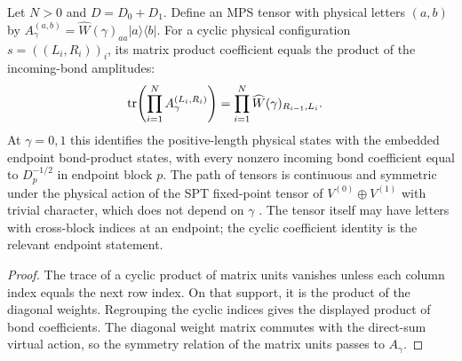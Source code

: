 \begin{lemma}
    \label{thm:spt_weighted_matrix_unit_bond_product}
    \leanok
    Let $N>0$ and $D=D_0+D_1$. Define an MPS tensor with physical
    letters $(a,b)$ by
    $A_\gamma^{(a,b)}=\widehat W(\gamma)_{aa}|a\rangle\langle b|$.
    For a cyclic physical configuration $s=((L_i,R_i))_i$, its matrix
    product coefficient equals the product of the incoming-bond
    amplitudes:
    \begin{align}
        \operatorname{tr}\!\left(\prod_{i=1}^N
        A_\gamma^{(L_i,R_i)}\right)
         & =\prod_{i=1}^N
        \widehat W(\gamma)_{R_{i-1},L_i}.
        \notag
    \end{align}
    At $\gamma=0,1$ this identifies the positive-length physical states
    with the embedded endpoint bond-product states, with every nonzero
    incoming bond coefficient equal to $D_p^{-1/2}$ in endpoint block $p$.
    The path of tensors is continuous and symmetric under the physical
    action of the SPT fixed-point tensor of $V^{(0)}\oplus V^{(1)}$ with
    trivial character, which does not depend on $\gamma$
    \cite[Section~II.F.2]{Schuch2011Phases}. The tensor itself
    may have letters with cross-block indices at an endpoint; the cyclic
    coefficient identity is the relevant endpoint statement.
\end{lemma}

\begin{proof}\leanok
    The trace of a cyclic product of matrix units vanishes unless each
    column index equals the next row index. On that support, it is the
    product of the diagonal weights. Regrouping the cyclic indices gives
    the displayed product of bond coefficients. The diagonal weight
    matrix commutes with the direct-sum virtual action, so the symmetry
    relation of the matrix units passes to $A_\gamma$.
\end{proof}

